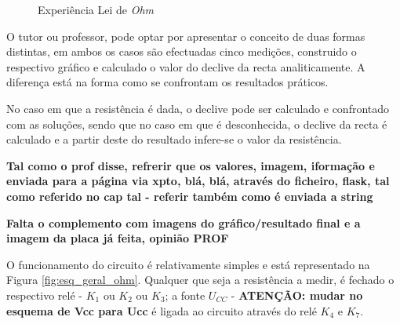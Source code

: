 \begin{figure}[hbtp]
	\centering%
		\centering
		\qquad
		\caption{Experiência Lei de \textit{Ohm}}%
		\label{fig:experienciaOHM}%
	\end{figure}
O tutor ou professor, pode optar por apresentar o conceito de duas formas distintas, em ambos os casos são efectuadas cinco medições, construido o respectivo gráfico e calculado o valor do declive da recta analiticamente. A diferença está na forma como se confrontam os resultados práticos. 

No caso em que a resistência é dada, o declive pode ser calculado e confrontado com as soluções, sendo que no caso em que é desconhecida, o declive da recta é calculado e a partir deste do resultado infere-se o valor da resistência. 

\textbf{Tal como o prof disse, refrerir que os valores, imagem, iformação e enviada para a página via xpto, blá, blá, através do ficheiro, flask, tal como referido no cap tal - referir também como é enviada a string}

\textbf{Falta o complemento com imagens do gráfico/resultado final e a imagem da placa já feita, opinião PROF}

O funcionamento do circuito é relativamente simples e está representado na Figura \ref{fig:esq_geral_ohm}. Qualquer que seja a resistência a medir, é fechado o respectivo relé - $K_{1}$ ou $K_{2}$ ou $K_{3}$; a fonte $U_{CC}$ - \textbf{ATENÇÃO: mudar no esquema de Vcc para Ucc} é ligada ao circuito através do relé $K_{4}$ e $K_{7}$.


